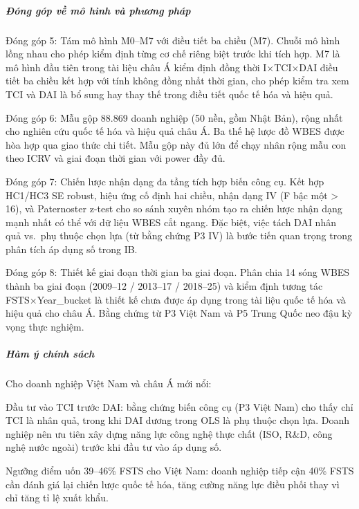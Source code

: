 \documentclass[
  a4paper,
  13pt]{extreport}
\begin{document}
\hypertarget{ux111uxf3ng-guxf3p-vux1ec1-muxf4-huxecnh-vuxe0-phux1b0ux1a1ng-phuxe1p}{%
\subparagraph{Đóng góp về mô hình và phương
pháp}\label{ux111uxf3ng-guxf3p-vux1ec1-muxf4-huxecnh-vuxe0-phux1b0ux1a1ng-phuxe1p}}

Đóng góp 5: Tám mô hình M0--M7 với điều tiết ba chiều (M7). Chuỗi mô
hình lồng nhau cho phép kiểm định từng cơ chế riêng biệt trước khi tích
hợp. M7 là mô hình đầu tiên trong tài liệu châu Á kiểm định đồng thời
I×TCI×DAI điều tiết ba chiều kết hợp với tính không đồng nhất thời gian,
cho phép kiểm tra xem TCI và DAI là bổ sung hay thay thế trong điều tiết
quốc tế hóa và hiệu quả.

Đóng góp 6: Mẫu gộp 88.869 doanh nghiệp (50 nền, gồm Nhật Bản), rộng
nhất cho nghiên cứu quốc tế hóa và hiệu quả châu Á. Ba thế hệ lược đồ
WBES được hòa hợp qua giao thức chi tiết. Mẫu gộp này đủ lớn để chạy
nhân rộng mẫu con theo ICRV và giai đoạn thời gian với power đầy đủ.

Đóng góp 7: Chiến lược nhận dạng đa tầng tích hợp biến công cụ. Kết hợp
HC1/HC3 SE robust, hiệu ứng cố định hai chiều, nhận dạng IV (F bậc một
\textgreater{} 16), và Paternoster z-test cho so sánh xuyên nhóm tạo ra
chiến lược nhận dạng mạnh nhất có thể với dữ liệu WBES cắt ngang. Đặc
biệt, việc tách DAI nhân quả vs.~phụ thuộc chọn lựa (từ bằng chứng P3
IV) là bước tiến quan trọng trong phân tích áp dụng số trong IB.

Đóng góp 8: Thiết kế giai đoạn thời gian ba giai đoạn. Phân chia 14 sóng
WBES thành ba giai đoạn (2009--12 / 2013--17 / 2018--25) và kiểm định
tương tác FSTS×Year\_bucket là thiết kế chưa được áp dụng trong tài liệu
quốc tế hóa và hiệu quả cho châu Á. Bằng chứng từ P3 Việt Nam và P5
Trung Quốc neo đậu kỳ vọng thực nghiệm.

\hypertarget{huxe0m-uxfd-chuxednh-suxe1ch}{%
\subparagraph{Hàm ý chính sách}\label{huxe0m-uxfd-chuxednh-suxe1ch}}

Cho doanh nghiệp Việt Nam và châu Á mới nổi:

Đầu tư vào TCI trước DAI: bằng chứng biến công cụ (P3 Việt Nam) cho thấy
chỉ TCI là nhân quả, trong khi DAI dương trong OLS là phụ thuộc chọn
lựa. Doanh nghiệp nên ưu tiên xây dựng năng lực công nghệ thực chất
(ISO, R\&D, công nghệ nước ngoài) trước khi đầu tư vào áp dụng số.

Ngưỡng điểm uốn 39--46\% FSTS cho Việt Nam: doanh nghiệp tiếp cận 40\%
FSTS cần đánh giá lại chiến lược quốc tế hóa, tăng cường năng lực điều
phối thay vì chỉ tăng tỉ lệ xuất khẩu.
\end{document}
